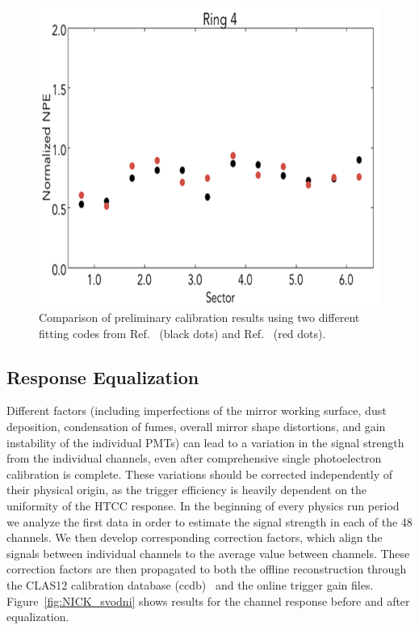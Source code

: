 \begin{figure}[ht]
\centering
\includegraphics[width=0.99\linewidth]{images/WILLIAM_4.png}
\caption{Comparison of preliminary calibration results using two different fitting codes from
  Ref.~\cite{bellamy1996} (black dots) and Ref.~\cite{degtiarenko2017} (red dots).}
\label{fig:WILLIAM_4}
\end{figure}

\subsection{Response Equalization}

Different factors (including imperfections of the mirror working surface, dust deposition, condensation of fumes,
overall mirror shape distortions, and gain instability of the individual PMTs) can lead to a variation in the signal
strength from the individual channels, even after comprehensive single photoelectron calibration is complete.
These variations should be corrected independently of their physical origin, as the trigger efficiency is heavily
dependent on the uniformity of the HTCC response. In the beginning of every physics run period we analyze the
first data in order to estimate the signal strength in each of the 48 channels. We then develop corresponding
correction factors, which align the signals between individual channels to the average value between channels. These
correction factors are then propagated to both the offline reconstruction through the CLAS12 calibration database
(ccdb)~\cite{recon-nim} and the online trigger gain files. Figure~\ref{fig:NICK_svodni} shows results for the
channel response before and after equalization.

